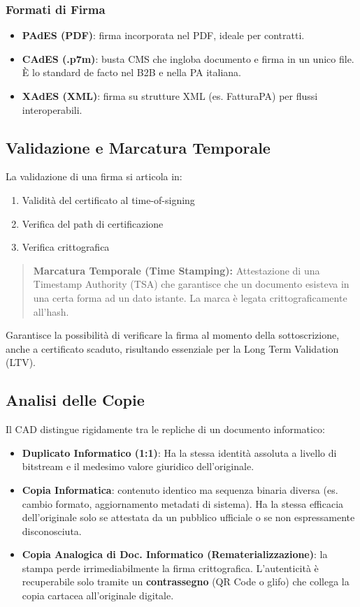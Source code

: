 \documentclass[11pt,a4paper]{article}
\begin{document}
\subsubsection{Formati di Firma}
\begin{itemize}
    \item \textbf{PAdES (PDF)}: firma incorporata nel PDF, ideale per contratti.
    \item \textbf{CAdES (.p7m)}: busta CMS che ingloba documento e firma in un unico file. È lo standard de facto nel B2B e nella PA italiana.
    \item \textbf{XAdES (XML)}: firma su strutture XML (es. FatturaPA) per flussi interoperabili.
\end{itemize}

\subsection{Validazione e Marcatura Temporale}
La validazione di una firma si articola in: 
\begin{enumerate}
    \item Validità del certificato al time-of-signing
    \item Verifica del path di certificazione
    \item Verifica crittografica
\end{enumerate}

\begin{quote}
\textbf{Marcatura Temporale (Time Stamping):}  Attestazione di una Timestamp Authority (TSA) che garantisce che un documento esisteva in una certa forma ad un dato istante. La marca è legata crittograficamente all'hash.
\end{quote}

Garantisce la possibilità di verificare la firma al momento della sottoscrizione, anche a certificato scaduto, risultando essenziale per la Long Term Validation (LTV).

\subsection{Analisi delle Copie}
Il CAD distingue rigidamente tra le repliche di un documento informatico:

\begin{itemize}
    \item \textbf{Duplicato Informatico (1:1)}: Ha la stessa identità assoluta a livello di bitstream e il medesimo valore giuridico dell'originale.
    \item \textbf{Copia Informatica}: contenuto identico ma sequenza binaria diversa (es. cambio formato, aggiornamento metadati di sistema). Ha la stessa efficacia dell'originale solo se attestata da un pubblico ufficiale o se non espressamente disconosciuta.
    \item \textbf{Copia Analogica di Doc. Informatico (Rematerializzazione)}: la stampa perde irrimediabilmente la firma crittografica. L'autenticità è recuperabile solo tramite un \textbf{contrassegno} (QR Code o glifo) che collega la copia cartacea all'originale digitale.
\end{itemize}
\end{document}
